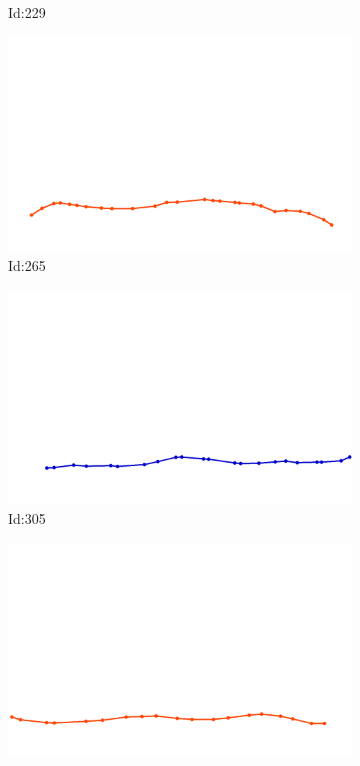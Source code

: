 \documentclass[12pt,twoside]{report}
\begin{document}
\begin{figure}
\begin{subfigure}[b]{0.20\textwidth}
\caption{Id:229}
\end{subfigure}
\begin{subfigure}[b]{0.20\textwidth}
\centering
\includegraphics[width=\textwidth]{../trajectories/265.png}
\caption{Id:265}
\end{subfigure}
\begin{subfigure}[b]{0.20\textwidth}
\centering
\includegraphics[width=\textwidth]{../trajectories/305.png}
\caption{Id:305}
\end{subfigure}
\begin{subfigure}[b]{0.20\textwidth}
\centering
\includegraphics[width=\textwidth]{../trajectories/307.png}

\end{subfigure}
\end{figure}
\end{document}
